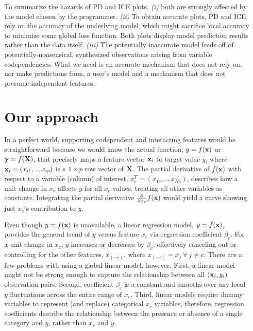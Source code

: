 \documentclass[12pt]{article}
\begin{document}
To summarize the hazards of PD and ICE plots, {\em (i)} both are strongly affected by the model chosen by the programmer.  {\em (ii)} To obtain accurate plots, PD and ICE rely on the accuracy of the underlying model, which might sacrifice local accuracy to minimize some global loss function.  Both plots display model prediction results rather than the data itself. {\em (iii)} The potentially inaccurate model feeds off of potentially-nonsensical, synthesized observations arising from variable codependencies. What we need is an accurate mechanism that does not rely on, nor make predictions from, a user's model and a mechanism that does not presume independent features.

\section{Our approach}

In a perfect world, supporting codependent and interacting features would be straightforward because we would know the actual function, $y = f({\bf x})$ or ${\bf y} = f(\bf X)$, that precisely maps a feature vector ${\bf x}_i$ to target value $y_i$ where ${\bf x}_i = ( x_{i1}, .., x_{ip} )$ is a $1 \times p$ row vector of $\bf X$. The partial derivative of $f({\bf x})$ with respect to a variable (column) of interest, $x_c^T = (x_{1c}, .., x_{Nc})$, describes how a unit change in $x_c$ affects $y$ for all $x_c$ values, treating all other variables as constants. Integrating the partial derivative $\frac{\partial}{\partial x_{c}} f({\bf x})$ would yield a curve showing just $x_{c}$'s contribution to $y$. 

Even though $y = f(\bf x)$ is unavailable, a linear regression model, $y = \hat{f}(\bf x)$, provides the general trend of $y$ versus feature $x_c$ via regression coefficient $\beta_c$. For a unit change in $x_c$, $y$ increases or decreases by $\beta_c$, effectively canceling out or controlling for the other features, $x_{(-c)}$, where $x_{(-c)} = x_{j} ~\forall~ j \neq c$. There are a few problems with using a global linear model, however.  First, a linear model might not be strong enough to capture the relationship between all $({\bf x}_i, y_i)$ observation pairs. Second, coefficient $\beta_c$ is a constant and smooths over any local $y$ fluctuations across the entire range of $x_c$. Third, linear models require dummy variables to represent (and replace) categorical $x_c$ variables, therefore, regression coefficients describe the relationship between the presence or absence of a single category and $y$, rather than $x_c$ and $y$.
\end{document}
